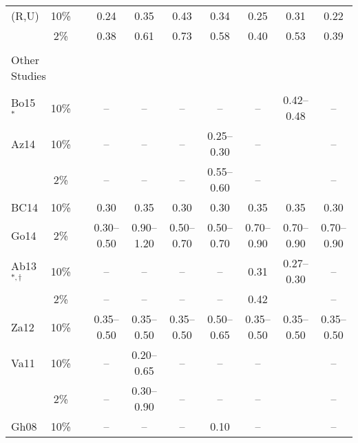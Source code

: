 \begin{table*}[t]
\begin{tabular}{lccccccccc}
    (R,U)   &  10\%  &&   0.24      &   0.35      &   0.43      &   0.34      &   0.25      &   0.31      &   0.22      \\
            &   2\%  &&   0.38      &   0.61      &   0.73      &   0.58      &   0.40      &   0.53      &   0.39      \\
    \hline                                                                                                              \\[-1.6ex]
    \multicolumn{2}{l}{Other Studies}                                                                                   \\[0.6ex]
    \cline{1-2} \cline{4-10}                                                                                            \\[-1.6ex]
    Bo15${}^{*}$ 
            &  10\%  &&   --        &   --        &   --        &   --        &   --        & 0.42--0.48  &   --        \\
    Az14    &  10\%  &&   --        &   --        &   --        & 0.25--0.30  &   --        &             &   --        \\
            &   2\%  &&   --        &   --        &   --        & 0.55--0.60  &   --        &             &   --        \\
    BC14    &  10\%  &&   0.30      &   0.35      &   0.30      &   0.30      &   0.35      &   0.35      &   0.30      \\
    Go14    &   2\%  && 0.30--0.50  & 0.90--1.20  & 0.50--0.70  & 0.50--0.70  & 0.70--0.90  & 0.70--0.90  & 0.70--0.90  \\
    Ab13${}^{*,\dagger}$ 
            &  10\%  &&   --        &   --        &   --        &   --        &   0.31      & 0.27--0.30  &   --        \\
            &   2\%  &&   --        &   --        &   --        &   --        &   0.42      &             &   --        \\
    Za12    &  10\%  && 0.35--0.50  & 0.35--0.50  & 0.35--0.50  & 0.50--0.65  & 0.35--0.50  & 0.35--0.50  & 0.35--0.50  \\
    Va11    &  10\%  &&   --        & 0.20--0.65  &   --        &   --        &   --        &             &   --        \\
            &   2\%  &&   --        & 0.30--0.90  &   --        &   --        &   --        &             &   --        \\
    Gh08    &  10\%  &&   --        &   --        &   --        &   0.10      &   --        &             &   --        \\

\end{tabular}
\end{table*}
